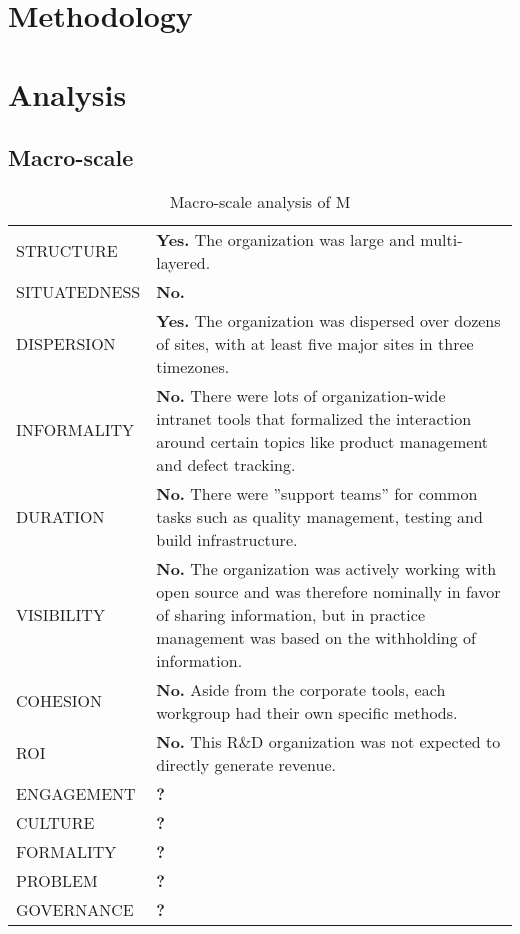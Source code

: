 \documentclass[
a4paper,
11pt,
parskip,
\MYLANGUAGE,
abstractoff,
bibliography=totoc
]{scrartcl}
\begin{document}
\section{Methodology}


\section{Analysis}

\subsection{Macro-scale}


\begin{table}[htbp]
\begin{center}
\begin{tabular}{lp{100mm}}
STRUCTURE & {\bf Yes.} The organization was large and multi-layered.\\
SITUATEDNESS & {\bf No.}\\
DISPERSION & {\bf Yes.} The organization was dispersed over dozens of sites, with at least five major sites in three timezones.\\
INFORMALITY & {\bf No.} There were lots of organization-wide intranet tools that formalized the interaction around certain topics like product management and defect tracking.\\
DURATION & {\bf No.} There were ''support teams'' for common tasks such as quality management, testing and build infrastructure.\\
VISIBILITY & {\bf No.} The organization was actively working with open source and was therefore nominally in favor of sharing information, but in practice management was based on the withholding of information. \\
COHESION & {\bf No.} Aside from the corporate tools, each workgroup had their own specific methods. \\
ROI & {\bf No.} This R{\&}D organization was not expected to directly generate revenue. \\
ENGAGEMENT & {\bf ?} \\
CULTURE & {\bf ?} \\
FORMALITY & {\bf ?} \\
PROBLEM & {\bf ?} \\
GOVERNANCE & {\bf ?} \\
\end{tabular}
\vspace{1em}
\caption{Macro-scale analysis of M}
\label{tab:macro1}
\end{center}
\end{table}
\end{document}
